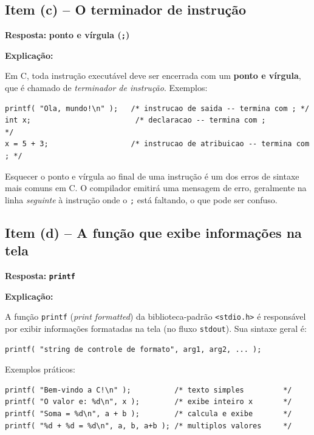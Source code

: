 \documentclass[12pt,a4paper]{article}
\begin{document}
\subsection*{Item (c) -- O terminador de instrução}

\begin{respostabox}
\textbf{Resposta:} \textcolor{deitelblue}{\textbf{ponto e vírgula (\texttt{;})}}

\medskip\textbf{Explicação:}

Em C, toda instrução executável deve ser encerrada com um \textbf{ponto e vírgula}, que é
chamado de \textit{terminador de instrução}. Exemplos:

\begin{lstlisting}
printf( "Ola, mundo!\n" );   /* instrucao de saida -- termina com ; */
int x;                        /* declaracao -- termina com ;          */
x = 5 + 3;                   /* instrucao de atribuicao -- termina com ; */
\end{lstlisting}

\begin{erroco}
  Esquecer o ponto e vírgula ao final de uma instrução é um dos erros de
  sintaxe mais comuns em C. O compilador emitirá uma mensagem de erro,
  geralmente na linha \textit{seguinte} à instrução onde o \texttt{;} está
  faltando, o que pode ser confuso.
\end{erroco}
\end{respostabox}

\subsection*{Item (d) -- A função que exibe informações na tela}

\begin{respostabox}
\textbf{Resposta:} \textcolor{deitelblue}{\textbf{\texttt{printf}}}

\medskip\textbf{Explicação:}

A função \texttt{printf} (\textit{print formatted}) da biblioteca-padrão \texttt{<stdio.h>}
é responsável por exibir informações formatadas na tela (no fluxo \texttt{stdout}).
Sua sintaxe geral é:

\begin{lstlisting}
printf( "string de controle de formato", arg1, arg2, ... );
\end{lstlisting}

Exemplos práticos:
\begin{lstlisting}
printf( "Bem-vindo a C!\n" );          /* texto simples         */
printf( "O valor e: %d\n", x );        /* exibe inteiro x       */
printf( "Soma = %d\n", a + b );        /* calcula e exibe       */
printf( "%d + %d = %d\n", a, b, a+b ); /* multiplos valores     */
\end{lstlisting}
\end{respostabox}
\end{document}

